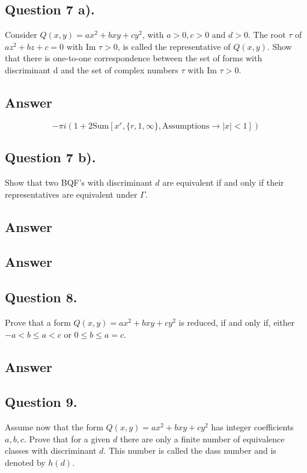 \subsection{Question 7 a).}
\noindent
Consider $Q(x,y)=a x^2 + b x y +c y^2$, with $a>0, c>0$ and $d>0$. The root $\tau$ of $a z^2 + b z + c = 0$ with
Im $\tau > 0$, is called the representative of $Q(x,y)$. Show that there is one-to-one correspondence between the
set of forms with discriminant d and the set of complex numbers $\tau$ with Im $\tau > 0$.

\subsection*{Answer}
\noindent
\[
-\pi  i \left(1+2 \text{Sum}\left[x^r,\{r,1,\infty \},\text{Assumptions}\to | x| <1\right]\right)
\]

\subsection{Question 7 b).}
\noindent
Show that two BQF's with discriminant $d$ are equivalent if and only if their representatives are equivalent under $\Gamma$.
\subsection*{Answer}
\noindent
[TBD]

\subsection*{Answer}
\noindent
[TBD]


\subsection{Question 8.}
\noindent
Prove that a form $Q(x,y) = a x^2 + b x y +c y^2$ is reduced, if and only if, either $-a < b \leq a < c$ or
$0 \leq b \leq a = c$.

\subsection*{Answer}
\noindent
[TBD]


\subsection{Question 9.}
\noindent
Assume now that the form $Q(x, y) = a x^2 + b x y + c y^2$ has integer coefficients $a, b, c$.
Prove that for a given $d$ there are only a finite number of equivalence classes  with discriminant $d$.
This number is called the dass number and is denoted by $h(d)$.

